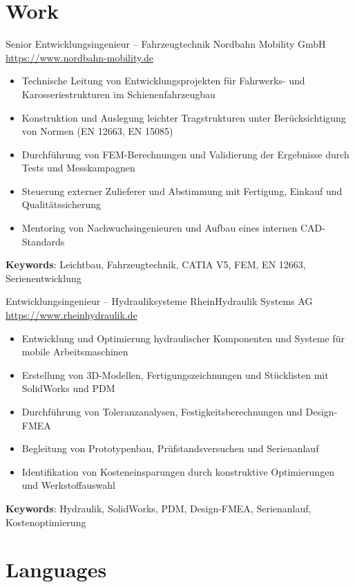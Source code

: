 \documentclass[a4paper, serif, 10pt]{moderncv}
\begin{document}
\section{Work}

        {Senior Entwicklungsingenieur – Fahrzeugtechnik}
        {Nordbahn Mobility GmbH}
        {\url{https://www.nordbahn-mobility.de}}
        {}
        {\begin{itemize}
\item Technische Leitung von Entwicklungsprojekten für Fahrwerks- und Karosseriestrukturen im Schienenfahrzeugbau
\item Konstruktion und Auslegung leichter Tragstrukturen unter Berücksichtigung von Normen (EN 12663, EN 15085)
\item Durchführung von FEM-Berechnungen und Validierung der Ergebnisse durch Tests und Messkampagnen
\item Steuerung externer Zulieferer und Abstimmung mit Fertigung, Einkauf und Qualitätssicherung
\item Mentoring von Nachwuchsingenieuren und Aufbau eines internen CAD-Standards
\end{itemize}
\textbf{Keywords}: Leichtbau, Fahrzeugtechnik, CATIA V5, FEM, EN 12663, Serienentwicklung}

        {Entwicklungsingenieur – Hydrauliksysteme}
        {RheinHydraulik Systems AG}
        {\url{https://www.rheinhydraulik.de}}
        {}
        {\begin{itemize}
\item Entwicklung und Optimierung hydraulischer Komponenten und Systeme für mobile Arbeitsmaschinen
\item Erstellung von 3D-Modellen, Fertigungszeichnungen und Stücklisten mit SolidWorks und PDM
\item Durchführung von Toleranzanalysen, Festigkeitsberechnungen und Design-FMEA
\item Begleitung von Prototypenbau, Prüfstandsversuchen und Serienanlauf
\item Identifikation von Kosteneinsparungen durch konstruktive Optimierungen und Werkstoffauswahl
\end{itemize}
\textbf{Keywords}: Hydraulik, SolidWorks, PDM, Design-FMEA, Serienanlauf, Kostenoptimierung}
\section{Languages}
\end{document}
